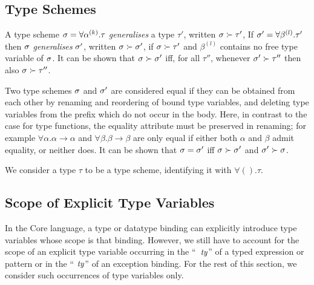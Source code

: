 \subsection{Type Schemes}
\label{type-scheme-sec}
A type scheme $\sigma=\forall\mbox{$\alpha^{(k)}$}.\tau$
 {\sl generalises} a type $\tau'$,
written $\sigma \succ\tau'$,
If $\sigma'=\forall\beta^{(l)}.\tau'$ then $\sigma$ {\sl generalises} $\sigma'$,
written $\sigma\succ\sigma'$, if $\sigma\succ\tau'$ and $\beta^{(l)}$ contains
no free type variable of $\sigma$.
It can be shown that $\sigma\succ\sigma'$ iff, for all $\tau''$, whenever
$\sigma'\succ\tau''$ then also $\sigma\succ\tau''$.

Two type schemes $\sigma$ and $\sigma'$ are considered equal
if they can be obtained from each other by
renaming and reordering of bound type variables, and deleting type
variables from the prefix which do not occur in the body.
Here, in contrast to the case for type functions, the equality attribute
must be preserved in renaming; for example $\forall\alpha.\alpha\to\alpha$
and $\forall\beta.\beta\to\beta$ are only equal if either both $\alpha$
and $\beta$ admit equality, or neither does.
It can be shown that $\sigma=\sigma'$ iff $\sigma\succ\sigma'$ and
$\sigma'\succ\sigma$.

We consider a type $\tau$ to be a type scheme, identifying it with
$\forall().\tau$.
\oldpagebreak

\subsection{Scope of Explicit Type Variables}
\label{scope-sec}

In the Core language, a type or datatype binding can 
explicitly introduce type variables whose scope is that binding.
 However,  we still have to account for the
scope of an explicit type variable occurring in the ``\ml{:}~${\it ty}$'' 
of a typed expression or pattern 
or in the `` ${\it ty}$'' of an exception binding. For the rest
of this section, we consider such  occurrences of type variables only.

